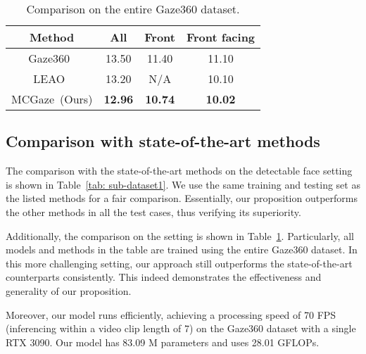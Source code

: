 \documentclass[journal]{IEEEtran}
\begin{document}
\begin{table}[t]
\setlength{\abovecaptionskip}{0cm}  \setlength{\belowcaptionskip}{-0.2cm} \caption{Comparison on the entire Gaze360 dataset.}
\centering
\tiny
\setlength{\tabcolsep}{3pt}
\begin{tabular}{c|ccc}
 \hline
Method & All & Front & Front facing \\ 
 \hline
Gaze360~\cite{kellnhofer2019gaze360} & 13.50 & 11.40 & 11.10\\
LEAO~\cite{kothari2021weakly} & 13.20 & N/A & 10.10\\
\hline
MCGaze~(Ours) & \textbf{12.96} & \textbf{10.74} & \textbf{10.02}\\
 \hline
\end{tabular}
\label{tab: all}
\vspace{-6mm}
\end{table}



\subsection{Comparison with state-of-the-art methods}
The comparison with the state-of-the-art methods on the detectable face setting is shown in Table~\ref{tab: sub-dataset1}. We use the same training and testing set as the listed methods for a fair comparison. Essentially, our proposition outperforms the other methods in all the test cases, thus verifying its superiority.

Additionally, the comparison on the  setting is shown in Table~\ref{tab: all}. Particularly, all models and methods in the table are trained using the entire Gaze360 dataset. 
In this more challenging setting, our approach still outperforms the state-of-the-art counterparts consistently. This indeed demonstrates the effectiveness and generality of our proposition. 



Moreover, our model runs efficiently, achieving a processing speed of 70 FPS (inferencing within a video clip length of 7) on the Gaze360 dataset with a single RTX 3090. Our model has 83.09 M parameters and uses 28.01 GFLOPs.
\end{document}
